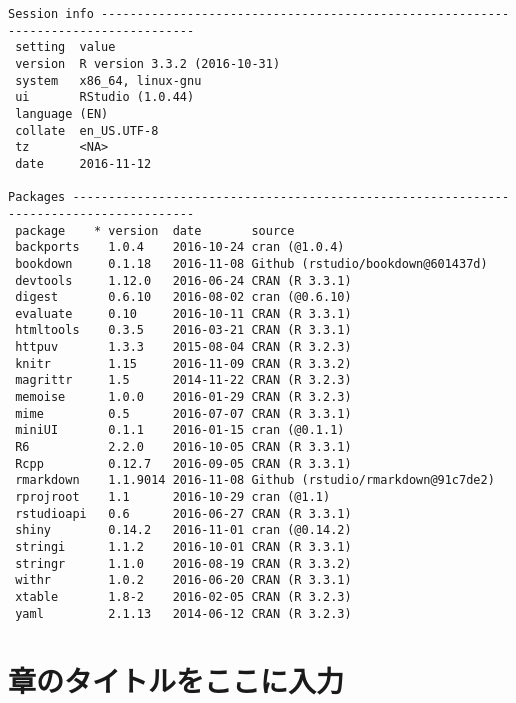 \documentclass[
]{book}
\begin{document}
\begin{verbatim}
Session info -----------------------------------------------------------------------------------
 setting  value                       
 version  R version 3.3.2 (2016-10-31)
 system   x86_64, linux-gnu           
 ui       RStudio (1.0.44)            
 language (EN)                        
 collate  en_US.UTF-8                 
 tz       <NA>                        
 date     2016-11-12                  

Packages ---------------------------------------------------------------------------------------
 package    * version  date       source                            
 backports    1.0.4    2016-10-24 cran (@1.0.4)                     
 bookdown     0.1.18   2016-11-08 Github (rstudio/bookdown@601437d) 
 devtools     1.12.0   2016-06-24 CRAN (R 3.3.1)                    
 digest       0.6.10   2016-08-02 cran (@0.6.10)                    
 evaluate     0.10     2016-10-11 CRAN (R 3.3.1)                    
 htmltools    0.3.5    2016-03-21 CRAN (R 3.3.1)                    
 httpuv       1.3.3    2015-08-04 CRAN (R 3.2.3)                    
 knitr        1.15     2016-11-09 CRAN (R 3.3.2)                    
 magrittr     1.5      2014-11-22 CRAN (R 3.2.3)                    
 memoise      1.0.0    2016-01-29 CRAN (R 3.2.3)                    
 mime         0.5      2016-07-07 CRAN (R 3.3.1)                    
 miniUI       0.1.1    2016-01-15 cran (@0.1.1)                     
 R6           2.2.0    2016-10-05 CRAN (R 3.3.1)                    
 Rcpp         0.12.7   2016-09-05 CRAN (R 3.3.1)                    
 rmarkdown    1.1.9014 2016-11-08 Github (rstudio/rmarkdown@91c7de2)
 rprojroot    1.1      2016-10-29 cran (@1.1)                       
 rstudioapi   0.6      2016-06-27 CRAN (R 3.3.1)                    
 shiny        0.14.2   2016-11-01 cran (@0.14.2)                    
 stringi      1.1.2    2016-10-01 CRAN (R 3.3.1)                    
 stringr      1.1.0    2016-08-19 CRAN (R 3.3.2)                    
 withr        1.0.2    2016-06-20 CRAN (R 3.3.1)                    
 xtable       1.8-2    2016-02-05 CRAN (R 3.2.3)                    
 yaml         2.1.13   2014-06-12 CRAN (R 3.2.3)     
\end{verbatim}

\hypertarget{ux7ae0ux306eux30bfux30a4ux30c8ux30ebux3092ux3053ux3053ux306bux5165ux529b}{%
\chapter{章のタイトルをここに入力}\label{ux7ae0ux306eux30bfux30a4ux30c8ux30ebux3092ux3053ux3053ux306bux5165ux529b}}
\end{document}
